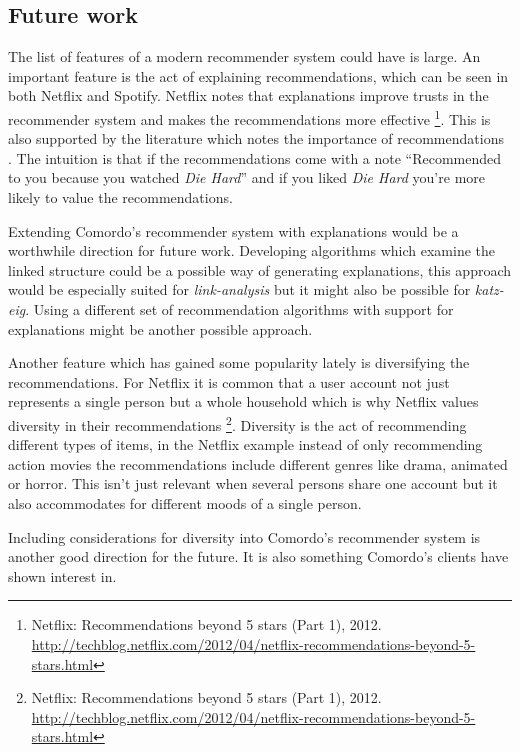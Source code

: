 
\subsection{Future work}

The list of features of a modern recommender system could have is large. An important feature is the act of explaining recommendations, which can be seen in both Netflix and Spotify. Netflix notes that explanations improve trusts in the recommender system and makes the recommendations more effective \footnote{
Netflix: Recommendations beyond 5 stars (Part 1), 2012.
\url{http://techblog.netflix.com/2012/04/netflix-recommendations-beyond-5-stars.html}
}.
This is also supported by the literature which notes the importance of recommendations \citep{hu2008collaborative, tintarev2007survey}.
The intuition is that if the recommendations come with a note ``Recommended to you because you watched \textit{Die Hard}'' and if you liked \textit{Die Hard} you're more likely to value the recommendations.

Extending Comordo's recommender system with explanations would be a worthwhile direction for future work. Developing algorithms which examine the linked structure could be a possible way of generating explanations, this approach would be especially suited for \textit{link-analysis} but it might also be possible for \textit{katz-eig}. Using a different set of recommendation algorithms with support for explanations \citep{hu2008collaborative} might be another possible approach.

Another feature which has gained some popularity lately \citep{bobadilla2013recommender} is diversifying the recommendations. For Netflix it is common that a user account not just represents a single person but a whole household which is why Netflix values diversity in their recommendations
\footnote{
Netflix: Recommendations beyond 5 stars (Part 1), 2012.
\url{http://techblog.netflix.com/2012/04/netflix-recommendations-beyond-5-stars.html}
}.
Diversity is the act of recommending different types of items, in the Netflix example instead of only recommending action movies the recommendations include different genres like drama, animated or horror. This isn't just relevant when several persons share one account but it also accommodates for different moods of a single person.

Including considerations for diversity into Comordo's recommender system is another good direction for the future. It is also something Comordo's clients have shown interest in.

